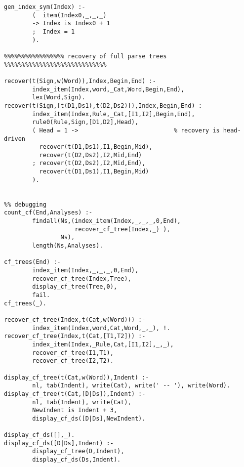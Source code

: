 \begin{verbatim}
gen_index_sym(Index) :-
        (  item(Index0,_,_,_)
        -> Index is Index0 + 1
        ;  Index = 1
        ).

%%%%%%%%%%%%%%%%% recovery of full parse trees %%%%%%%%%%%%%%%%%%%%%%%%%%%%%

recover(t(Sign,w(Word)),Index,Begin,End) :-       
        index_item(Index,word,_Cat,Word,Begin,End),
        lex(Word,Sign). 
recover(t(Sign,[t(D1,Ds1),t(D2,Ds2)]),Index,Begin,End) :-
        index_item(Index,Rule,_Cat,[I1,I2],Begin,End),
        rule0(Rule,Sign,[D1,D2],Head),
        ( Head = 1 ->                           % recovery is head-driven
          recover(t(D1,Ds1),I1,Begin,Mid),
          recover(t(D2,Ds2),I2,Mid,End)
        ; recover(t(D2,Ds2),I2,Mid,End),
          recover(t(D1,Ds1),I1,Begin,Mid)
        ).


%% debugging
count_cf(End,Analyses) :-
        findall(Ns,(index_item(Index,_,_,_,0,End),
                    recover_cf_tree(Index,_) ),
                Ns),
        length(Ns,Analyses).

cf_trees(End) :-
        index_item(Index,_,_,_,0,End),
        recover_cf_tree(Index,Tree),
        display_cf_tree(Tree,0),
        fail.
cf_trees(_).

recover_cf_tree(Index,t(Cat,w(Word))) :-
        index_item(Index,word,Cat,Word,_,_), !.
recover_cf_tree(Index,t(Cat,[T1,T2])) :-
        index_item(Index,_Rule,Cat,[I1,I2],_,_),
        recover_cf_tree(I1,T1),
        recover_cf_tree(I2,T2).
        
display_cf_tree(t(Cat,w(Word)),Indent) :-
        nl, tab(Indent), write(Cat), write(' -- '), write(Word).
display_cf_tree(t(Cat,[D|Ds]),Indent) :-
        nl, tab(Indent), write(Cat), 
        NewIndent is Indent + 3,
        display_cf_ds([D|Ds],NewIndent).

display_cf_ds([],_).
display_cf_ds([D|Ds],Indent) :-
        display_cf_tree(D,Indent),
        display_cf_ds(Ds,Indent).


\end{verbatim}
